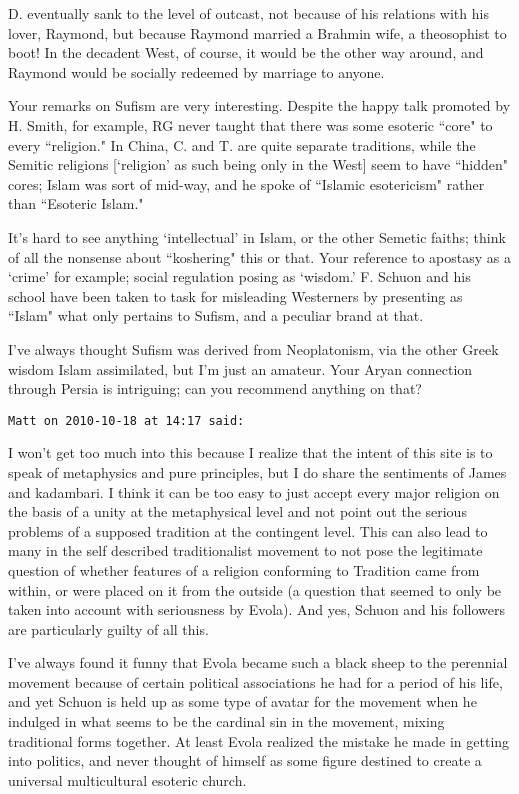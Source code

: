 \begin{footnotesize}
\begin{sffamily}
D. eventually sank to the level of outcast, not because of his relations with his lover, Raymond, but because Raymond married a Brahmin wife, a theosophist to boot! In the decadent West, of course, it would be the other way around, and Raymond would be socially redeemed by marriage to anyone.

Your remarks on Sufism are very interesting. Despite the happy talk promoted by H. Smith, for example, RG never taught that there was some esoteric ``core" to every ``religion." In China, C. and T. are quite separate traditions, while the Semitic religions [`religion' as such being only in the West] seem to have ``hidden" cores; Islam was sort of mid-way, and he spoke of ``Islamic esotericism" rather than ``Esoteric Islam." 

It's hard to see anything `intellectual' in Islam, or the other Semetic faiths; think of all the nonsense about ``koshering" this or that. Your reference to apostasy as a `crime' for example; social regulation posing as `wisdom.' F. Schuon and his school have been taken to task for misleading Westerners by presenting as ``Islam" what only pertains to Sufism, and a peculiar brand at that. 

I've always thought Sufism was derived from Neoplatonism, via the other Greek wisdom Islam assimilated, but I'm just an amateur. Your Aryan connection through Persia is intriguing; can you recommend anything on that?


\hfill

\texttt{Matt on 2010-10-18 at 14:17 said: }

I won't get too much into this because I realize that the intent of this site is to speak of metaphysics and pure principles, but I do share the sentiments of James and kadambari. I think it can be too easy to just accept every major religion on the basis of a unity at the metaphysical level and not point out the serious problems of a supposed tradition at the contingent level. This can also lead to many in the self described traditionalist movement to not pose the legitimate question of whether features of a religion conforming to Tradition came from within, or were placed on it from the outside (a question that seemed to only be taken into account with seriousness by Evola). And yes, Schuon and his followers are particularly guilty of all this.

I've always found it funny that Evola became such a black sheep to the perennial movement because of certain political associations he had for a period of his life, and yet Schuon is held up as some type of avatar for the movement when he indulged in what seems to be the cardinal sin in the movement, mixing traditional forms together. At least Evola realized the mistake he made in getting into politics, and never thought of himself as some figure destined to create a universal multicultural esoteric church.


\hfill


\end{sffamily}\end{footnotesize}
